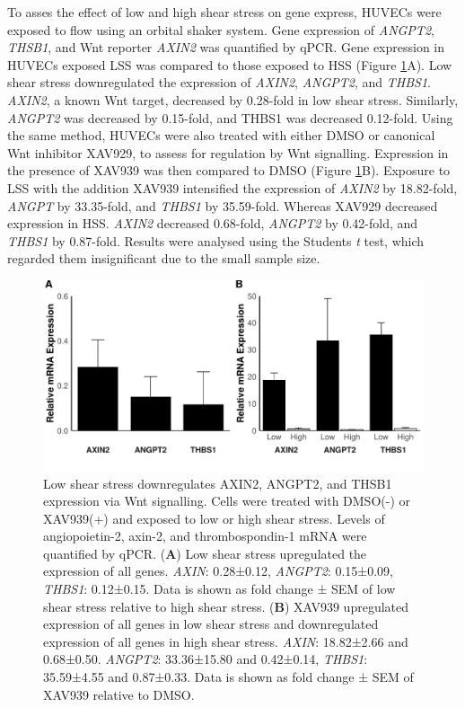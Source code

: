 \documentclass[
  11pt,
]{article}
\begin{document}
To asses the effect of low and high shear stress on gene express, HUVECs were exposed to flow using an orbital shaker system.
Gene expression of \emph{ANGPT2}, \emph{THSB1}, and Wnt reporter \emph{AXIN2} was quantified by qPCR.
Gene expression in HUVECs exposed LSS was compared to those exposed to HSS (Figure \ref{fig:plots}A).
Low shear stress downregulated the expression of \emph{AXIN2}, \emph{ANGPT2}, and \emph{THBS1}.
\emph{AXIN2}, a known Wnt target, decreased by 0.28-fold in low shear stress.
Similarly, \emph{ANGPT2} was decreased by 0.15-fold, and THBS1 was decreased 0.12-fold.
Using the same method, HUVECs were also treated with either DMSO or canonical Wnt inhibitor XAV929, to assess for regulation by Wnt signalling.
Expression in the presence of XAV939 was then compared to DMSO (Figure \ref{fig:plots}B).
Exposure to LSS with the addition XAV939 intensified the expression of \emph{AXIN2} by 18.82-fold, \emph{ANGPT} by 33.35-fold, and \emph{THBS1} by 35.59-fold.
Whereas XAV929 decreased expression in HSS.
\emph{AXIN2} decreased 0.68-fold, \emph{ANGPT2} by 0.42-fold, and \emph{THBS1} by 0.87-fold.
Results were analysed using the Students \emph{t} test, which regarded them insignificant due to the small sample size.

\begin{figure}

{\centering \includegraphics{report_files/figure-latex/plots-1} 

}

\caption{Low shear stress downregulates AXIN2, ANGPT2, and THSB1 expression via Wnt signalling. Cells were treated with DMSO(-) or XAV939(+) and exposed to low or high shear stress. Levels of angiopoietin-2, axin-2, and thrombospondin-1 mRNA were quantified by qPCR. (\textbf{A}) Low shear stress upregulated the expression of all genes. \emph{AXIN}: 0.28±0.12, \emph{ANGPT2}: 0.15±0.09, \emph{THBS1}: 0.12±0.15. Data is shown as fold change ± SEM of low shear stress relative to high shear stress. (\textbf{B}) XAV939 upregulated expression of all genes in low shear stress and downregulated expression of all genes in high shear stress. \emph{AXIN}: 18.82±2.66 and 0.68±0.50. \emph{ANGPT2}: 33.36±15.80 and 0.42±0.14, \emph{THBS1}: 35.59±4.55 and 0.87±0.33. Data is shown as fold change ± SEM of XAV939 relative to DMSO.}\label{fig:plots}
\end{figure}
\end{document}
